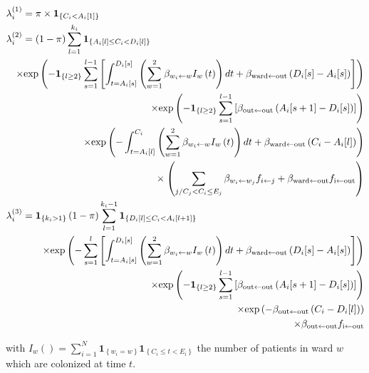 \documentclass[10pt]{article}
\begin{document}
\begin{eqnarray*}
\lefteqn{\lambda_i^{\left(1\right)} = \pi \times \mathbf{1}_{\left\lbrace C_i < A_i[1] \right\rbrace} }\\
\lefteqn{\lambda_i^{\left(2\right)}  = \left( 1-\pi \right) \sum_{l=1}^{k_i} \mathbf{1}_{\left\lbrace A_i[l] \leq C_i < D_i[l] \right\rbrace}}\\
	 && \times \text{exp}\left( - \mathbf{1}_{\left\lbrace l \geq 2 \right\rbrace} \sum_{s=1}^{l-1} \left[ \int_{t=A_i[s]}^{D_i[s]} \left( \sum_{w=1}^{2} \beta_{w_i \leftarrow w} I_w\left(t\right) \right)dt + \beta_{\text{ward} \leftarrow \text{out}}\left(D_i[s]-A_i[s]\right) \right] \right) \\
	 && \times \text{exp}\left( - \mathbf{1}_{\left\lbrace l \geq 2 \right\rbrace} \sum_{s=1}^{l-1} \left[ \beta_{\text{out} \leftarrow \text{out}}\left(A_i[s+1]-D_i[s]\right) \right] \right) \\
	 && \times \text{exp}\left( - \int_{t=A_i[l]}^{C_i} \left( \sum_{w=1}^{2} \beta_{w_i \leftarrow w} I_w\left(t\right) \right)dt + \beta_{\text{ward} \leftarrow \text{out}}\left(C_i-A_i[l]\right)  \right) \\
	 && {} \times \left( \sum_{j/C_j<C_i\leq E_j} \beta_{w_i \leftarrow w_j} f_{i \leftarrow j} + \beta_{\text{ward} \leftarrow \text{out}}f_{\text{i} \leftarrow \text{out}} \right) \\
\lefteqn{\lambda_i^{\left(3\right)}  = \mathbf{1}_{\left\lbrace k_i > 1 \right\rbrace} \left( 1-\pi \right) \sum_{l=1}^{k_i-1} \mathbf{1}_{\left\lbrace D_i[l] \leq C_i < A_i[l+1] \right\rbrace}}\\
	 && \times \text{exp}\left( - \sum_{s=1}^{l} \left[ \int_{t=A_i[s]}^{D_i[s]} \left( \sum_{w=1}^{2} \beta_{w_i \leftarrow w} I_w\left(t\right) \right)dt + \beta_{\text{ward} \leftarrow \text{out}}\left(D_i[s]-A_i[s]\right) \right] \right) \\
	 && \times \text{exp}\left( - \mathbf{1}_{\left\lbrace l \geq 2 \right\rbrace} \sum_{s=1}^{l-1} \left[ \beta_{\text{out} \leftarrow \text{out}}\left(A_i[s+1]-D_i[s]\right) \right] \right) \\
	 && \times \text{exp}\left( - \beta_{\text{out} \leftarrow \text{out}}\left(C_i-D_i[l]\right) \right) \\
	 && \times \beta_{\text{out} \leftarrow \text{out}}f_{\text{i} \leftarrow \text{out}}  \\
\end{eqnarray*}

\noindent with $I_w\left(\right)=\sum_{i=1}^{N} \mathbf{1}_{\left\lbrace w_i=w \right\rbrace} \mathbf{1}_{\left\lbrace C_i \leq t < E_i \right\rbrace}$ the number of patients in ward $w$ which are colonized at time $t$.
\end{document}
